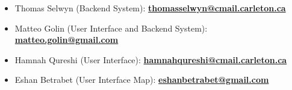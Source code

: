 \begin{itemize}
    \item Thomas Selwyn (Backend System): \href{mailto:thomasselwyn@cmail.carleton.ca?subject=Question regarding CU InSpace Software}{\textbf{thomasselwyn@cmail.carleton.ca}}
    \item Matteo Golin (User Interface and Backend System): \href{mailto:matteo.golin@gmail.com?subject=Question regarding CU InSpace Software}{\textbf{matteo.golin@gmail.com}}
    \item Hamnah Qureshi (User Interface): \href{mailto:hamnahqureshi@cmail.carleton.ca?subject=Question regarding CU InSpace Software}{\textbf{hamnahqureshi@cmail.carleton.ca}}
    \item Eshan Betrabet (User Interface Map): \href{mailto:eshanbetrabet@gmail.com?subject=Question regarding CU InSpace Software}{\textbf{eshanbetrabet@gmail.com}}
\end{itemize}
